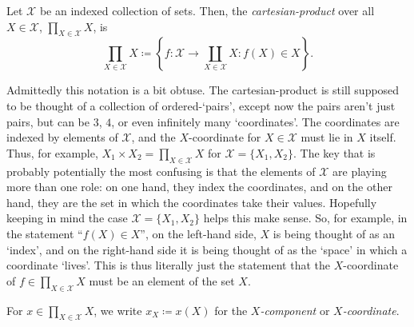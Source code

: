 \begin{dfn}\label{CartesianProductCollection}
Let $\mathcal{X}$ be an indexed collection of sets.  Then, the \emph{cartesian-product} over all $X\in \mathcal{X}$, $\prod _{X\in \mathcal{X}}X$, is
\begin{equation}
\prod _{X\in \mathcal{X}}X\coloneqq \left\{ f:\mathcal{X}\rightarrow \coprod _{X\in \mathcal{X}}X:f(X)\in X\right\} .
\end{equation}
\begin{rmk}
Admittedly this notation is a bit obtuse.  The cartesian-product is still supposed to be thought of a collection of ordered-`pairs', except now the pairs aren't just pairs, but can be $3$, $4$, or even infinitely many `coordinates'.  The coordinates are indexed by elements of $\mathcal{X}$, and the $X$-coordinate for $X\in \mathcal{X}$ must lie in $X$ itself.  Thus, for example, $X_1\times X_2=\prod _{X\in \mathcal{X}}X$ for $\mathcal{X}=\{ X_1,X_2\}$.  The key that is probably potentially the most confusing is that the elements of $\mathcal{X}$ are playing more than one role:  on one hand, they index the coordinates, and on the other hand, they are the set in which the coordinates take their values.  Hopefully keeping in mind the case $\mathcal{X}=\{ X_1,X_2\}$ helps this make sense.  So, for example, in the statement ``$f(X)\in X$'', on the left-hand side, $X$ is being thought of as an `index', and on the right-hand side it is being thought of as the `space' in which a coordinate `lives'.  This is thus literally just the statement that the $X$-coordinate of $f\in \prod _{X\in \mathcal{X}}X$ must be an element of the set $X$.
\end{rmk}
\begin{rmk}
For $x\in \prod _{X\in \mathcal{X}}X$, we write $x_X\coloneqq x(X)$ for the \emph{$X$-component} or \emph{$X$-coordinate}.
\end{rmk}
\end{dfn}
